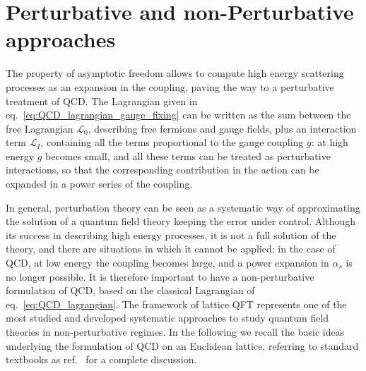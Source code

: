 \section{Perturbative and non-Perturbative approaches}
The property of asymptotic freedom allows to compute high energy scattering processes as
an expansion in the coupling, paving the way to a perturbative treatment of QCD.
The Lagrangian given in eq.~\eqref{eq:QCD_lagrangian_gauge_fixing}
can be written as the sum between the free Lagrangian $\mathcal{L}_0$, describing free fermions and gauge fields, 
plus an interaction term $\mathcal{L}_I$, containing all the terms proportional to the gauge coupling $g$:
at high energy $g$ becomes small, and all these terms 
can be treated as perturbative interactions, so that the corresponding
contribution in the action can be expanded in a power series of the coupling.

%
In general, perturbation theory can be seen as a systematic way of approximating the solution 
of a quantum field theory keeping the error under control.
Although its success in describing high energy processes, it is not a full solution of the theory, 
and there are situations in which it cannot be applied: in the case of QCD, at low energy the coupling
becomes large, and a power expansion in $\alpha_s$ is no longer possible. 
It is therefore important to have a non-perturbative formulation of QCD, based on the classical Lagrangian 
of eq.~\eqref{eq:QCD_lagrangian}.
The framework of lattice QFT represents one of the most studied and developed systematic approaches to study quantum
field theories in non-perturbative regimes. In the following we recall the basic ideas underlying the formulation of 
QCD on an Euclidean lattice, referring to standard textbooks as ref.~\cite{smit_2002} for a complete discussion.


